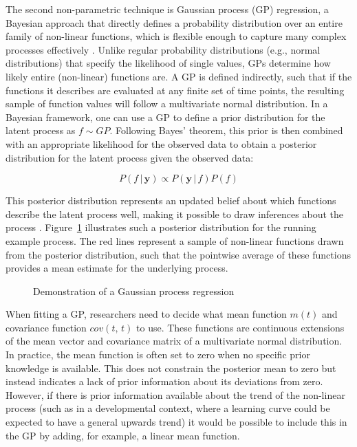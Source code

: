 \documentclass[man, floatsintext]{apa7}
\begin{document}
The second non-parametric technique is Gaussian process (GP) regression, a
Bayesian approach that directly defines a probability distribution over an
entire family of non-linear functions, which is flexible enough to capture many
complex processes effectively \parencite{rasmussen_gaussian_2006,
  betancourt_robust_2020, roberts_gaussian_2013}. Unlike regular probability
distributions (e.g., normal distributions) that specify the likelihood of
single values, GPs determine how likely entire (non-linear) functions are. A GP
is defined indirectly, such that if the functions it describes are evaluated at
any finite set of time points, the resulting sample of function values will
follow a multivariate normal distribution. In a Bayesian framework, one can use
a GP to define a prior distribution for the latent process as $f \sim GP$.
Following Bayes' theorem, this prior is then combined with an appropriate
likelihood for the observed data to obtain a posterior distribution for the
latent process given the observed data:

\begin{equation}
  P(f \, | \, \textbf{y})  \propto P(\textbf{y} \, | \, f) P(f)
\end{equation}

\noindent This posterior distribution represents an updated belief about which
functions describe the latent process well, making it possible to draw
inferences about the process \parencite{rasmussen_gaussian_2006}.
Figure~\ref{fig:gp_dem} illustrates such a posterior distribution for the
running example process. The red lines represent a sample of non-linear
functions drawn from the posterior distribution, such that the pointwise
average of these functions provides a mean estimate for the underlying process.

\begin{figure}[!t]
  \caption{Demonstration of a Gaussian process regression}
  \label{fig:gp_dem}
\end{figure}

When fitting a GP, researchers need to decide what mean function $m(t)$ and
covariance function $cov(t, \, t)$ to use. These functions are continuous
extensions of the mean vector and covariance matrix of a multivariate normal
distribution. In practice, the mean function is often set to zero when no
specific prior knowledge is available. This does not constrain the posterior
mean to zero but instead indicates a lack of prior information about its
deviations from zero. However, if there is prior information available about
the trend of the non-linear process (such as in a developmental context, where
a learning curve could be expected to have a general upwards trend) it would be
possible to include this in the GP by adding, for example, a linear mean
function.
\end{document}
